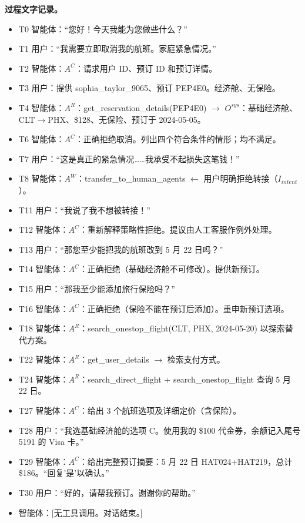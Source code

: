 \documentclass[11pt,UTF8,fontset=fandol]{ctexart}
\begin{document}
\textbf{过程文字记录。}
\begin{itemize}[leftmargin=1.6em]
\item T0 智能体：``您好！今天我能为您做些什么？''
\item T1 用户：``我需要立即取消我的航班。家庭紧急情况。''
\item T2 智能体：$A^C$：请求用户 ID、预订 ID 和预订详情。
\item T3 用户：提供 sophia\_taylor\_9065、预订 PEP4E0。经济舱、无保险。
\item T4 智能体：$A^R$：get\_reservation\_details(PEP4E0) $\to$ $O^{sys}$：基础经济舱、CLT$\to$PHX、\$128、无保险、预订于 2024-05-05。
\item T6 智能体：$A^C$：正确拒绝取消。列出四个符合条件的情形；均不满足。
\item T7 用户：``这是真正的紧急情况……我承受不起损失这笔钱！''
\item T8 智能体：$A^W$：transfer\_to\_human\_agents $\leftarrow$ 用户明确拒绝转接（$I_{intent}$）。
\item T11 用户：``我说了我不想被转接！''
\item T12 智能体：$A^C$：重新解释策略性拒绝。提议由人工客服作例外处理。
\item T13 用户：``那您至少能把我的航班改到 5 月 22 日吗？''
\item T14 智能体：$A^C$：正确拒绝（基础经济舱不可修改）。提供新预订。
\item T15 用户：``那我至少能添加旅行保险吗？''
\item T16 智能体：$A^C$：正确拒绝（保险不能在预订后添加）。重申新预订选项。
\item T18 智能体：$A^R$：search\_onestop\_flight(CLT, PHX, 2024-05-20) 以探索替代方案。
\item T22 智能体：$A^R$：get\_user\_details $\to$ 检索支付方式。
\item T24 智能体：$A^R$：search\_direct\_flight + search\_onestop\_flight 查询 5 月 22 日。
\item T27 智能体：$A^C$：给出 3 个航班选项及详细定价（含保险）。
\item T28 用户：``我选基础经济舱的选项 C。使用我的 \$100 代金券，余额记入尾号 5191 的 Visa 卡。''
\item T29 智能体：$A^C$：给出完整预订摘要：5 月 22 日 HAT024+HAT219，总计 \$186。``回复'是'以确认。''
\item T30 用户：``好的，请帮我预订。谢谢你的帮助。''
\item 智能体：[无工具调用。对话结束。]
\end{itemize}
\end{document}
